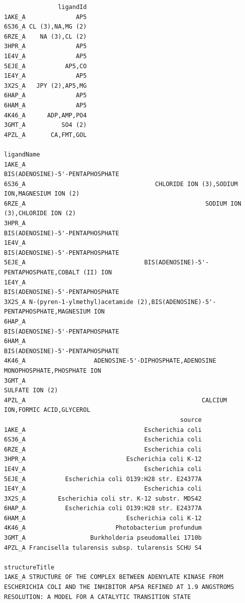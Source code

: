 \documentclass[
  letterpaper,
  DIV=11,
  numbers=noendperiod]{scrartcl}
\begin{document}
\begin{verbatim}
               ligandId
1AKE_A              AP5
6S36_A CL (3),NA,MG (2)
6RZE_A    NA (3),CL (2)
3HPR_A              AP5
1E4V_A              AP5
5EJE_A           AP5,CO
1E4Y_A              AP5
3X2S_A   JPY (2),AP5,MG
6HAP_A              AP5
6HAM_A              AP5
4K46_A      ADP,AMP,PO4
3GMT_A          SO4 (2)
4PZL_A       CA,FMT,GOL
                                                                             ligandName
1AKE_A                                                 BIS(ADENOSINE)-5'-PENTAPHOSPHATE
6S36_A                                    CHLORIDE ION (3),SODIUM ION,MAGNESIUM ION (2)
6RZE_A                                                  SODIUM ION (3),CHLORIDE ION (2)
3HPR_A                                                 BIS(ADENOSINE)-5'-PENTAPHOSPHATE
1E4V_A                                                 BIS(ADENOSINE)-5'-PENTAPHOSPHATE
5EJE_A                                 BIS(ADENOSINE)-5'-PENTAPHOSPHATE,COBALT (II) ION
1E4Y_A                                                 BIS(ADENOSINE)-5'-PENTAPHOSPHATE
3X2S_A N-(pyren-1-ylmethyl)acetamide (2),BIS(ADENOSINE)-5'-PENTAPHOSPHATE,MAGNESIUM ION
6HAP_A                                                 BIS(ADENOSINE)-5'-PENTAPHOSPHATE
6HAM_A                                                 BIS(ADENOSINE)-5'-PENTAPHOSPHATE
4K46_A                   ADENOSINE-5'-DIPHOSPHATE,ADENOSINE MONOPHOSPHATE,PHOSPHATE ION
3GMT_A                                                                  SULFATE ION (2)
4PZL_A                                                 CALCIUM ION,FORMIC ACID,GLYCEROL
                                                 source
1AKE_A                                 Escherichia coli
6S36_A                                 Escherichia coli
6RZE_A                                 Escherichia coli
3HPR_A                            Escherichia coli K-12
1E4V_A                                 Escherichia coli
5EJE_A           Escherichia coli O139:H28 str. E24377A
1E4Y_A                                 Escherichia coli
3X2S_A         Escherichia coli str. K-12 substr. MDS42
6HAP_A           Escherichia coli O139:H28 str. E24377A
6HAM_A                            Escherichia coli K-12
4K46_A                         Photobacterium profundum
3GMT_A                  Burkholderia pseudomallei 1710b
4PZL_A Francisella tularensis subsp. tularensis SCHU S4
                                                                                                                                                                     structureTitle
1AKE_A STRUCTURE OF THE COMPLEX BETWEEN ADENYLATE KINASE FROM ESCHERICHIA COLI AND THE INHIBITOR AP5A REFINED AT 1.9 ANGSTROMS RESOLUTION: A MODEL FOR A CATALYTIC TRANSITION STATE

\end{verbatim}
\end{document}
